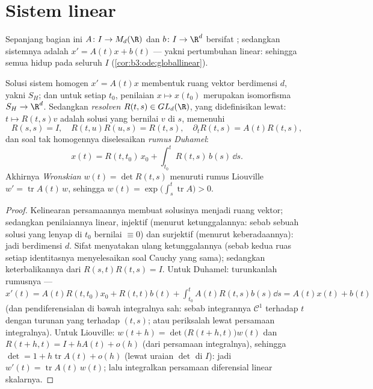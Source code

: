 \section{Sistem linear}

Sepanjang bagian ini $A \colon I \to M_d(\R)$ dan $b
\colon I \to \R^d$ bersifat ; sedangkan sistemnya adalah $x' = A(t)x
+ b(t)$ --- yakni pertumbuhan linear: sehingga semua  hidup pada seluruh
$I$ (\cref{cor:b3:ode:globallinear}).

\begin{theorem}[Struktur]\label{thm:b3:ode:linearstructure}
Solusi sistem homogen $x' = A(t)x$ membentuk ruang
vektor berdimensi $d$, yakni $S_H$; dan untuk setiap $t_0$,
penilaian $x \mapsto x(t_0)$ merupakan isomorfisma $S_H \to
\R^d$. Sedangkan \emph{resolven} $R(t, s) \in GL_d(\R)$, yang didefinisikan lewat: $t \mapsto R(t,
s)v$ adalah solusi yang bernilai $v$ di $s$, memenuhi
\[
R(s,s) = I,\quad R(t, u)R(u, s) = R(t, s),\quad
\partial_tR(t,s) = A(t)R(t,s),
\]
dan soal tak homogennya diselesaikan \emph{rumus
Duhamel}:
\[
x(t) = R(t, t_0)\,x_0 + \int_{t_0}^{t}R(t, s)\,b(s)\,\dd s .
\]
Akhirnya \emph{Wronskian} $w(t) = \det
R(t, s)$ menuruti rumus Liouville $w' =
\operatorname{tr}A(t)\,w$, sehingga $w(t) =
\exp\bigl(\int_s^t\operatorname{tr}A\bigr) > 0$.
\end{theorem}

\begin{proof}
Kelinearan persamaannya membuat solusinya menjadi ruang vektor;
sedangkan penilaiannya linear, injektif (menurut ketunggalannya: sebab sebuah solusi
yang lenyap di $t_0$ bernilai $\equiv 0$) dan surjektif (menurut keberadaannya):
jadi berdimensi $d$. Sifat  menyatakan ulang ketunggalannya
(sebab kedua ruas setiap identitasnya menyelesaikan soal Cauchy yang sama);
sedangkan keterbalikannya dari $R(s,t)R(t,s) = I$. Untuk Duhamel: turunkanlah
rumusnya --- $x'(t) = A(t)R(t,t_0)x_0 + R(t,t)b(t) +
\int_{t_0}^tA(t)R(t,s)b(s)\dd s = A(t)x(t) + b(t)$
(dan pendiferensialan di bawah integralnya sah: sebab
integrannya $\mathcal C^1$ terhadap $t$ dengan turunan yang 
terhadap $(t,s)$; atau periksalah lewat persamaan integralnya). Untuk Liouville:
$w(t + h) = \det\bigl(R(t+h, t)\bigr)w(t)$ dan $R(t + h, t) =
I + hA(t) + o(h)$ (dari persamaan integralnya), sehingga $\det = 1
+ h\operatorname{tr}A(t) + o(h)$ (lewat uraian $\det$ di
$I$): jadi $w'(t) = \operatorname{tr}A(t)\,w(t)$; lalu integralkan
persamaan diferensial linear skalarnya.
\end{proof}

